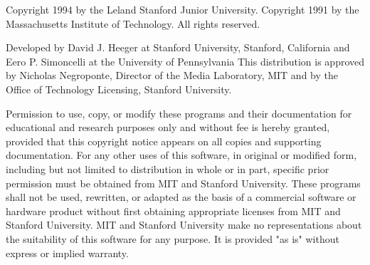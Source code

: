 Copyright 1994 by the Leland Stanford Junior University.  Copyright
1991 by the Massachusetts Institute of Technology.  All rights
reserved.
   
Developed by David J. Heeger at Stanford University, Stanford,
California and Eero P. Simoncelli at the University of Pennsylvania
This distribution is approved by Nicholas Negroponte, Director of the
Media Laboratory, MIT and by the Office of Technology Licensing,
Stanford University.

Permission to use, copy, or modify these programs and their
documentation for educational and research purposes only and without
fee is hereby granted, provided that this copyright notice appears on
all copies and supporting documentation.  For any other uses of this
software, in original or modified form, including but not limited to
distribution in whole or in part, specific prior permission must be
obtained from MIT and Stanford University.  These programs shall not
be used, rewritten, or adapted as the basis of a commercial software
or hardware product without first obtaining appropriate licenses from
MIT and Stanford University.  MIT and Stanford University make no
representations about the suitability of this software for any
purpose.  It is provided "as is" without express or implied warranty.

\newpage
